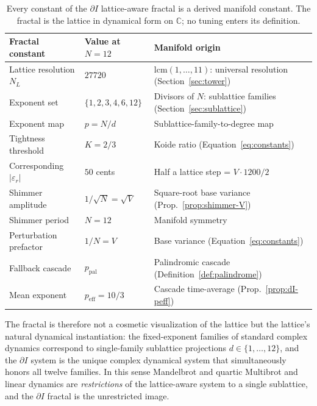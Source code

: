 \documentclass[11pt,a4paper]{article}
\theoremstyle{definition}
\theoremstyle{remark}
\newcommand{\C}{\mathbb{C}}
\begin{document}
\begin{table}[h]
\centering
\begin{tabular}{@{}l l l@{}}
\toprule
Fractal constant & Value at $N=12$ & Manifold origin\\
\midrule
Lattice resolution $N_{L}$ & $27720$ & $\mathrm{lcm}(1,\ldots,11)$: universal resolution (Section~\ref{sec:tower})\\
Exponent set & $\{1,2,3,4,6,12\}$ & Divisors of $N$: sublattice families (Section~\ref{sec:sublattice})\\
Exponent map & $p = N/d$ & Sublattice-family-to-degree map\\
Tightness threshold & $K = 2/3$ & Koide ratio (Equation~\eqref{eq:constants})\\
Corresponding $|\varepsilon_{r}|$ & $50$ cents & Half a lattice step = $V\cdot 1200/2$\\
Shimmer amplitude & $1/\sqrt{N} = \sqrt{V}$ & Square-root base variance (Prop.~\ref{prop:shimmer-V})\\
Shimmer period & $N=12$ & Manifold symmetry\\
Perturbation prefactor & $1/N = V$ & Base variance (Equation~\eqref{eq:constants})\\
Fallback cascade & $p_{\mathrm{pal}}$ & Palindromic cascade (Definition~\ref{def:palindrome})\\
Mean exponent & $p_{\mathrm{eff}} = 10/3$ & Cascade time-average (Prop.~\ref{prop:dI-peff})\\
\bottomrule
\end{tabular}
\caption{Every constant of the $\partial I$ lattice-aware fractal is a derived manifold constant. The fractal is the lattice in dynamical form on $\C$; no tuning enters its definition.}
\label{tab:fractal-constants}
\end{table}

The fractal is therefore not a cosmetic visualization of the lattice but the lattice's natural dynamical instantiation: the fixed-exponent families of standard complex dynamics correspond to single-family sublattice projections $d\in\{1,\ldots,12\}$, and the $\partial I$ system is the unique complex dynamical system that simultaneously honors all twelve families. In this sense Mandelbrot and quartic Multibrot and linear dynamics are \emph{restrictions} of the lattice-aware system to a single sublattice, and the $\partial I$ fractal is the unrestricted image.
\end{document}
